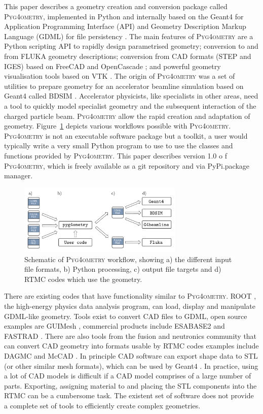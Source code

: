 \documentclass[final,5p,times,twocolumn]{elsarticle}
\newcommand{\PYGEOMETRY}{\textsc{Pyg4ometry}}
\begin{document}
This paper describes a geometry creation and conversion package called \PYGEOMETRY{}, implemented in Python and internally based on the Geant4 for Application Programming Interface (API) and Geometry Description Markup Language (GDML) for file persistency  \cite{GDML}. The main features of \PYGEOMETRY{} are a Python scripting API to rapidly design parametrised geometry; conversion to and from  FLUKA geometry descriptions; conversion from CAD formats  (STEP and IGES) based on FreeCAD \cite{FreeCAD} and OpenCascade \cite{OpenCASCADE}; and powerful geometry visualisation tools based on VTK \cite{VTK4}. The origin of \PYGEOMETRY{} was a set of utilities to prepare geometry for an accelerator beamline simulation based on Geant4 called BDSIM \cite{BDSIM_Nevay}. Accelerator physicists, like specialists in other areas, need a tool to quickly model specialist geometry and the subsequent interaction of the charged particle beam. \PYGEOMETRY{} allow the rapid creation and 
adaptation of geometry. Figure~\ref{fig:workflow} depicts various workflows possible with \PYGEOMETRY{}. \PYGEOMETRY{} is not an executable software package but a toolkit, a user would typically write a very small Python program to use to use the classes and functions provided by \PYGEOMETRY{}. This paper describes version 1.0 o f \PYGEOMETRY{}, which is freely available as a git repository and via PyPi.package manager. 

\begin{figure}[hbt!]
  \normalsize
  \centering
  \includegraphics[width=0.7\textwidth]{./diagrams/workflow.pdf}
  \caption{\label{fig:workflow}Schematic of \PYGEOMETRY{} workflow, showing a) the different input file formats, b) Python processing, c) output file targets and d) RTMC codes which use the geometry. }
\end{figure}

There are existing codes that have functionality similar to \PYGEOMETRY{}. ROOT \cite{Brun:1997pa}, the high-energy physics data analysis program, can load, display and manipulate GDML-like geometry. Tools exist to convert CAD files to GDML, open source examples are GUIMesh \cite{GUIMesh_Pinto}, commercial products include ESABASE2 \cite{ESABASE2} and FASTRAD \cite{FASTRAD}. There are also tools from the fusion and 
neutronics community that can convert CAD geometry into formats usable by RTMC codes examples include DAGMC \cite{DAGMC} and McCAD \cite{McCad}.  
In principle CAD software can export shape data to STL (or other similar mesh formats), which can be used by Geant4 \cite{poole2012acad}. In practice, using a lot of CAD models is difficult if a CAD model comprises of a large number of parts. Exporting, assigning material to and placing the STL components into the RTMC can be a cumbersome task. The existent set of software does not provide a complete set of tools to efficiently create complex geometries.
\end{document}
